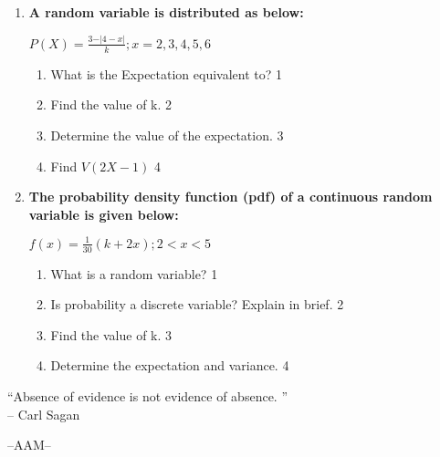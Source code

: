 \documentclass[12pt]{article}
\begin{document}
\begin{enumerate}
          \item \textbf{A random variable is distributed as below:}
        
        \begin{center}
  \textbf{$P(X) = \frac{3-\vert 4-x\vert}{k}; x=2,3,4,5,6$}
  \end{center}

  \begin{enumerate}
    \item
	What is the Expectation equivalent to? \hfill 1
    \item
    	Find the value of k. \hfill 2
    \item
    	Determine the value of the expectation. \hfill 3
     \item
     	Find $V(2X-1)$ \hfill 4
  \end{enumerate}

       \item \textbf{The probability density function (pdf) of a continuous random variable is given below:}
	  
	  \begin{center}
	  $\displaystyle f(x) = \frac{1}{30} (k+2x); 2 < x < 5$
	  \end{center}
  
  \begin{enumerate}
    \item
    What is a random variable? \hfill 1
    \item
		Is probability a discrete variable? Explain in brief. \hfill 2
    \item  
	Find the value of k.  \hfill 3
    \item
	Determine the expectation and variance. \hfill 4
  \end{enumerate}

  
\end{enumerate}

 \vspace{2.5cm}

\begin{center}
 “Absence of evidence is not evidence of absence. ” \\ -- Carl Sagan
 

  
  \vfill
  --AAM--
\end{center}


\newpage
\setcounter{page}{1}
\end{document}
